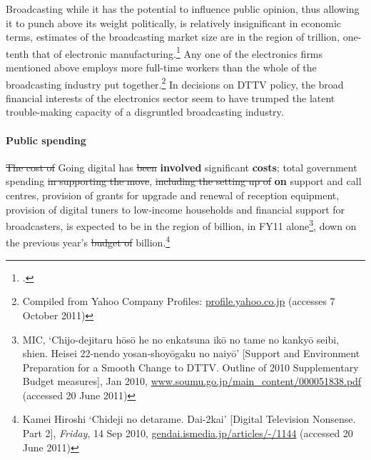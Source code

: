\documentclass[11pt, oneside, a4paper, headsepline]{scrartcl}
\newcommand{\citej}[2] {\footcite[\nopp #1]{#2} }
\newcommand{\ty}{\textyen}
\begin{document}
{%

Broadcasting while it has the potential to influence public opinion, thus allowing it to punch above its weight politically, is relatively insignificant in economic terms, estimates of the broadcasting market size are in the region of \ty3.9 trillion, one-tenth that of electronic manufacturing.\citej{28, 126}{Miyazaki:2011} Any one of the electronics firms mentioned above employs more full-time workers than the whole of the broadcasting industry put together.\footnote{Compiled from Yahoo Company Profiles: \url{profile.yahoo.co.jp} (accesses 7 October 2011)} In decisions on DTTV policy, the broad financial interests of the electronics sector seem to have trumped the latent trouble-making capacity of a disgruntled broadcasting industry.
}

\paragraph{Public spending} \st{The cost of }Going digital has \st{been} \textbf{involved} significant \textbf{costs}; total government spending \st{in supporting the move}, \st{including the setting up of } \textbf{on} support and call centres, provision of grants for upgrade and renewal of reception equipment, provision of digital tuners to low-income households and financial support for broadcasters, is expected to be in the region of \ty66 billion, in FY11 alone\footnote{MIC, `Chijo-dejitaru h\={o}s\={o} he no enkatsuna ik\={o} no tame no kanky\={o} seibi, shien. Heisei 22-nendo yosan-shoy\={o}gaku no naiy\={o}' [Support and Environment Preparation for a Smooth Change to DTTV. Outline of 2010 Supplementary Budget measures], Jan 2010, \url{www.soumu.go.jp/main_content/000051838.pdf}\label{note:enkatsu} (accessed 20 June 2011)}, down on the previous year's\st{ budget of} \ty87 billion.\footnote{Kamei Hiroshi `Chideji no detarame. Dai-2kai' [Digital Television Nonsense. Part 2], \emph{Friday}, 14 Sep 2010, \url{gendai.ismedia.jp/articles/-/1144}\label{note:deta2} (accessed 20 June 2011)}
\end{document}
